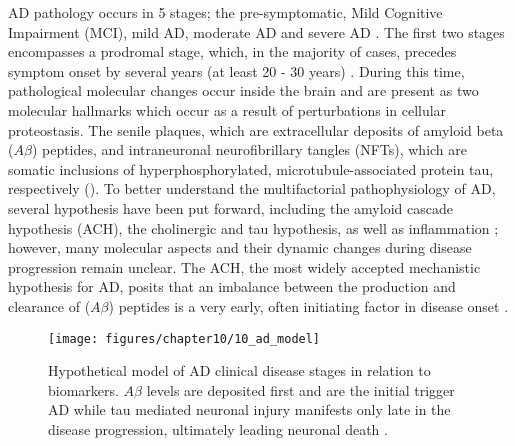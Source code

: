 AD pathology occurs in 5 stages; the pre-symptomatic, Mild Cognitive Impairment (MCI), mild AD, moderate AD and severe AD \citep{Caldwell2015}. The first two stages encompasses a prodromal stage, which, in the majority of cases, precedes symptom onset by several years (at least 20 - 30 years) \citep{Caldwell2015,Caselli2013,Penn1993}. During this time, pathological molecular changes occur inside the brain and are present as two molecular hallmarks which occur as a result of perturbations in cellular proteostasis. The senile plaques, which are extracellular deposits of amyloid beta ($A\beta$)
peptides, and intraneuronal neurofibrillary tangles (NFTs), which are somatic inclusions of hyperphosphorylated, microtubule-associated protein tau, respectively \citep{Mattson2008} (). To better understand the multifactorial pathophysiology of AD, several hypothesis have been put forward, including the amyloid cascade hypothesis (ACH), the cholinergic and tau hypothesis, as well as inflammation \citep{Kurz2011}; however, many molecular aspects and their dynamic changes during disease progression remain unclear. The ACH, the most widely accepted mechanistic hypothesis for AD, posits that an imbalance between the production and clearance of ($A\beta$) peptides is a very early, often initiating factor in disease onset \citep{Hardy2009,Hardy1992}.

\begin{figure}[!htbp]
  \texttt{[image: figures/chapter10/10\_ad\_model]}
  \caption[Hypothetical model of AD clinical disease stages in relation to biomarkers.]{Hypothetical model of AD clinical disease stages in relation to biomarkers. $A\beta$ levels are deposited first and are the initial trigger AD while tau mediated neuronal injury manifests only late in the disease progression, ultimately leading neuronal death \citep{Petrella2013} .}
  \label{fig:10_ad_model}
\end{figure}

